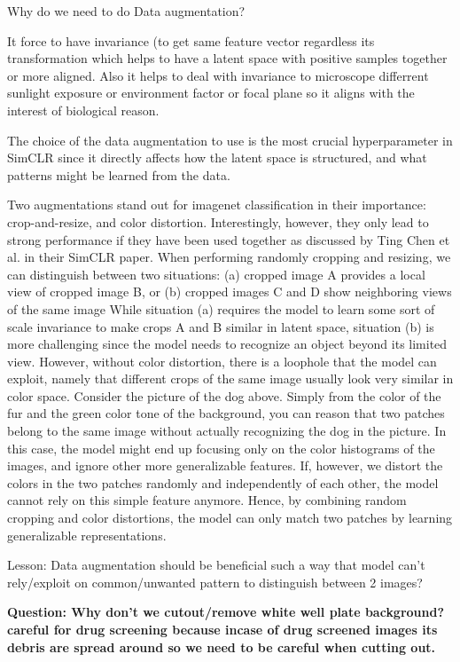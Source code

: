 \documentclass[12pt,twoside,a4paper,parskip]{scrbook} %
\begin{document}
Why do we need to do Data augmentation? 

It force to have invariance (to get same feature vector regardless its transformation which helps to have a latent space with positive samples together or more aligned. Also it helps to deal with invariance to microscope differrent sunlight exposure or environment factor or focal plane so it aligns with the interest of biological reason.

The choice of the data augmentation to use is the most crucial hyperparameter in SimCLR since it directly affects how the latent space is structured, and what patterns might be learned from the data.

Two augmentations stand out for imagenet classification in their importance: crop-and-resize, and color distortion. Interestingly, however, they only lead to strong performance if they have been used together as discussed by Ting Chen et al. in their SimCLR paper. When performing randomly cropping and resizing, we can distinguish between two situations: (a) cropped image A provides a local view of cropped image B, or (b) cropped images C and D show neighboring views of the same image
While situation (a) requires the model to learn some sort of scale invariance to make crops A and B similar in latent space, situation (b) is more challenging since the model needs to recognize an object beyond its limited view. However, without color distortion, there is a loophole that the model can exploit, namely that different crops of the same image usually look very similar in color space. Consider the picture of the dog above. Simply from the color of the fur and the green color tone of the background, you can reason that two patches belong to the same image without actually recognizing the dog in the picture. In this case, the model might end up focusing only on the color histograms of the images, and ignore other more generalizable features. If, however, we distort the colors in the two patches randomly and independently of each other, the model cannot rely on this simple feature anymore. Hence, by combining random cropping and color distortions, the model can only match two patches by learning generalizable representations.

Lesson: Data augmentation should be beneficial such a way that model can't rely/exploit on common/unwanted pattern to distinguish between 2 images?

\textbf{Question: Why don't we cutout/remove white well plate background? careful for drug screening because incase of drug screened images its debris are spread around so we need to be careful when cutting out.}
\end{document}
